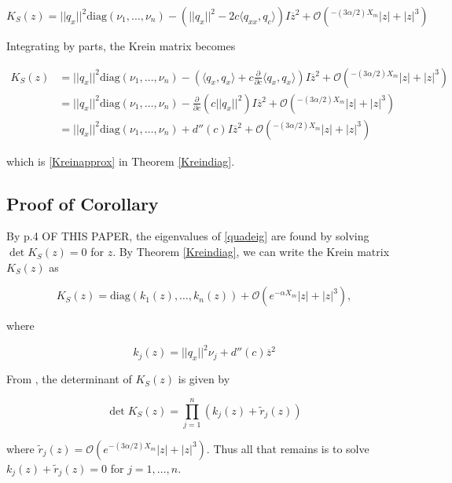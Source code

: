 \documentclass[12pt]{article}
\begin{document}
\begin{equation}\label{Kreinform2}
K_S(z) = ||q_x||^2 \text{diag}(\nu_1, \dots, \nu_n) 
- ( ||q_x||^2 -2 c \langle q_{xx}, q_c \rangle) I \overline{z}^2  + \mathcal{O}(^{-(3 \alpha/2) X_m}|z| + |z|^3)
\end{equation}

Integrating by parts, the Krein matrix becomes

\begin{align*}
K_S(z)
&= ||q_x||^2 \text{diag}(\nu_1, \dots, \nu_n) - \left( \langle q_x, q_x \rangle + c \frac{\partial}{\partial c}\langle q_x, q_x \rangle \right)I\overline{z}^2 + \mathcal{O}(^{-(3 \alpha/2) X_m}|z| + |z|^3)  \\
&= ||q_x||^2 \text{diag}(\nu_1, \dots, \nu_n) -\frac{\partial}{\partial c} \left( c||q_x||^2 \right) I \overline{z}^2  + \mathcal{O}(^{-(3 \alpha/2) X_m}|z| + |z|^3) \\
&= ||q_x||^2 \text{diag}(\nu_1, \dots, \nu_n) + d''(c) I \overline{z}^2  + \mathcal{O}(^{-(3 \alpha/2) X_m}|z| + |z|^3)
\end{align*}

which is \eqref{Kreinapprox} in Theorem \ref{Kreindiag}.

\subsection{Proof of Corollary}

By p.4 OF THIS PAPER, the eigenvalues of \eqref{quadeig} are found by solving $\det K_S(z) = 0$ for $z$. By Theorem \ref{Kreindiag}, we can write the Krein matrix $K_S(z)$ as 

\begin{equation}
K_S(z) = \text{diag}(k_1(z), \dots, k_n(z)) + \mathcal{O}(e^{-\alpha X_m}|z| + |z|^3),
\end{equation}

where

\begin{equation}
k_j(z) = ||q_x||^2 \nu_j + d''(c) \overline{z}^2
\end{equation}

From \cite{Ipsen2008}, the determinant of $K_S(z)$ is given by

\begin{equation}\label{detK}
\det K_S(z) = \prod_{j = 1}^n (k_j(z) + \tilde{r}_j(z))
\end{equation}

where $\tilde{r}_j(z) = \mathcal{O}(e^{-(3 \alpha/2) X_m}|z| + |z|^3)$. Thus all that remains is to solve $k_j(z) + \tilde{r}_j(z) = 0$ for $j = 1, \dots, n$.\\
\end{document}
